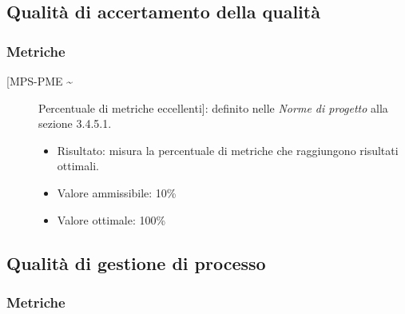 \documentclass[../piano-di-qualifica.tex]{subfiles}
\begin{document}


\subsection{Qualità di accertamento della qualità}%
\label{subsec:qualita_accertamento_qualita}

\subsubsection{Metriche}%
\label{subsec:metriche_aq}

\begin{description}
  \item [[MPS-PME \textasciitilde] Percentuale di metriche eccellenti]: definito nelle \textit{Norme di progetto} alla sezione 3.4.5.1.
  \begin{itemize} \item Risultato: misura la percentuale di metriche che raggiungono risultati ottimali. \item Valore ammissibile: 10\% \item Valore ottimale: 100\%  \end{itemize}
\end{description}

\subsection{Qualità di gestione di processo}%
\label{subsec:qualita_processo}

\subsubsection{Metriche}%
\label{subsec:metriche_pr}
\end{document}
